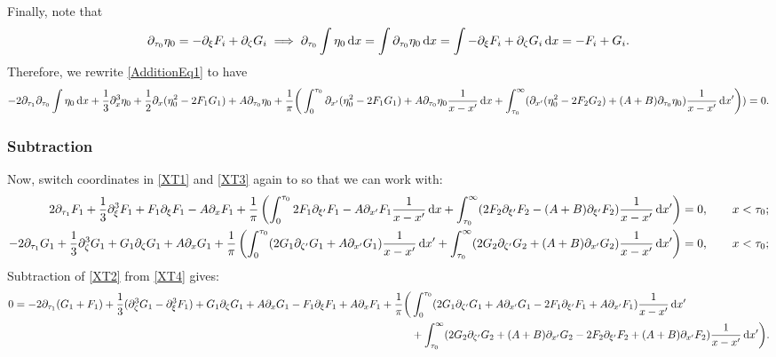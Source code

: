\documentclass[10pt,reqno,oneside,a4paper, landscape]{article}
\begin{document}
Finally, note that 
 \[ \partial_{\tau_0} \eta_0 = - \partial_\xi F_i + \partial_\zeta G_i \implies \partial_{\tau_0} \int \eta_0 \,\mathrm{d} x = \int \partial_{\tau_0} \eta_0 \,\mathrm{d} x = \int  - \partial_{\xi} F_i + \partial_{\zeta} G_i  \,\mathrm{d} x = - F_i + G_i.\]
 Therefore, we rewrite \eqref{AdditionEq1} to have
\[ - 2 \partial_{\tau_1} \partial_{\tau_0} \int \eta_0 \,\mathrm{d} x + \frac{1}{3} \partial_x^3 \eta_0+ \frac{1}{2} \partial_x( \eta_0^2 - 2 F_1 G_1 )  +A \partial_{\tau_0} \eta_0 + \frac{1}{\pi} \bigg(\int_0^{\tau_0} \partial_{x'}( \eta_0^2 - 2 F_1 G_1 ) + A\partial_{\tau_0} \eta_0 \frac{1}{x -x'} \,\mathrm{d} x + \int^{\infty}_{\tau_0} ( \partial_{x'}(\eta_0^2 - 2 F_2 G_2) + (A+B) \partial_{\tau_0}\eta_0 )\frac{1}{x -x'} \,\mathrm{d} x' \bigg))  = 0.\]

\subsubsection*{Subtraction}
Now, switch coordinates in \eqref{XT1} and \eqref{XT3} again to so that we can work with:
\begin{align}
2 \partial_{\tau_1}F_1 + \frac{1}{3} \partial_\xi^3 F_1 + F_1\partial_\xi F_1 - A\partial_x F_1+ \frac{1}{\pi} \left(\int_0^{\tau_0} 2 F_1\partial_{\xi'} F_1  - A\partial_{x'} F_1\frac{1}{x -x'} \,\mathrm{d} x + \int^{\infty}_{\tau_0} (2 F_2\partial_{\xi'} F_2 - (A+B) \partial_{\xi'} F_2 )\frac{1}{x -x'} \,\mathrm{d} x' \right)  &= 0, \qquad x < \tau_0; \label{XT2}\\
- 2 \partial_{\tau_1} G_1 +  \frac{1}{3} \partial_\zeta^3 G_1+ G_1\partial_{\zeta} G_1 +A \partial_{x} G_1  +  \frac{1}{\pi} \left( \int^{\tau_0}_{0} (2 G_1\partial_{\zeta'} G_1 + A \partial_{x'} G_1) \frac{1}{x-x'} \,\mathrm{d} x' + \int^{\infty}_{\tau_0} (2 G_2\partial_{\zeta'} G_2+(A+B) \partial_{x'} G_2 )\frac{1}{x -x'} \,\mathrm{d} x' \right) &= 0, \qquad x < \tau_0; \label{XT4}
\end{align}
Subtraction of \eqref{XT2} from \eqref{XT4} gives:
\begin{align*}
0 = - 2 \partial_{\tau_1} (G_1 + F_1)+  \frac{1}{3}( \partial_\zeta^3 G_1 - \partial_\xi^3 F_1 )+ G_1\partial_{\zeta} G_1 +A \partial_{x} G_1 - F_1\partial_\xi F_1 + A\partial_x F_1 +  \frac{1}{\pi} \bigg(&\int^{\tau_0}_{0} (2 G_1\partial_{\zeta'} G_1 + A \partial_{x'} G_1- 2 F_1\partial_{\xi'} F_1  + A\partial_{x'} F_1) \frac{1}{x-x'} \,\mathrm{d} x' \\
&+ \int^{\infty}_{\tau_0} (2 G_2\partial_{\zeta'} G_2+(A+B) \partial_{x'} G_2 - 2 F_2\partial_{\xi'} F_2 + (A+B) \partial_{x'} F_2)\frac{1}{x -x'} \,\mathrm{d} x' \bigg). 
\end{align*}
\end{document}
